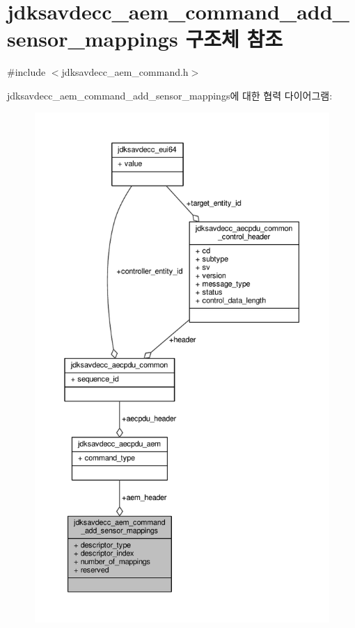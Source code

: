 \hypertarget{structjdksavdecc__aem__command__add__sensor__mappings}{}\section{jdksavdecc\+\_\+aem\+\_\+command\+\_\+add\+\_\+sensor\+\_\+mappings 구조체 참조}
\label{structjdksavdecc__aem__command__add__sensor__mappings}


{\ttfamily \#include $<$jdksavdecc\+\_\+aem\+\_\+command.\+h$>$}



jdksavdecc\+\_\+aem\+\_\+command\+\_\+add\+\_\+sensor\+\_\+mappings에 대한 협력 다이어그램\+:
\nopagebreak
\begin{figure}[H]
\begin{center}
\leavevmode
\includegraphics[height=550pt]{structjdksavdecc__aem__command__add__sensor__mappings__coll__graph}
\end{center}
\end{figure}
